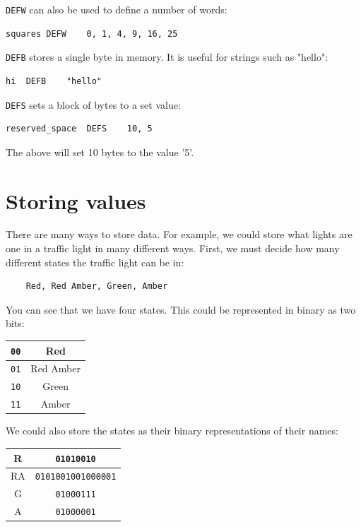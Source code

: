 \documentclass{article}
\begin{document}
{\tt DEFW} can also be used to define a number of words:

\begin{verbatim}
squares	DEFW	0, 1, 4, 9, 16, 25
\end{verbatim}

{\tt DEFB} stores a single byte in memory. It is useful for strings such as "hello":

\begin{verbatim}
hi	DEFB	"hello"
\end{verbatim}

{\tt DEFS} sets a block of bytes to a set value:

\begin{verbatim}
reserved_space	DEFS	10, 5
\end{verbatim}

The above will set 10 bytes to the value '5'.

\section{Storing values}


There are many ways to store data. For example, we could store what lights are
one in a traffic light in many different ways. First, we must decide how many
different states the traffic light can be in:

\begin{verbatim}
	Red, Red Amber, Green, Amber
\end{verbatim}

You can see that we have four states. This could be represented in binary as two
bits:

\begin{center}
	\begin{tabular}{|c|c|}
		\hline
		{\tt 00} & Red\\ \hline
		{\tt 01} & Red Amber\\ \hline
		{\tt 10} & Green\\ \hline
		{\tt 11} & Amber\\ \hline
	\end{tabular}
\end{center}

We could also store the states as their binary representations of their names:

\begin{center}
	\begin{tabular}{|c|c|}
		\hline
		R & {\tt 01010010}\\ \hline
		RA & {\tt 0101001001000001}\\ \hline
		G & {\tt 01000111}\\ \hline
		A & {\tt 01000001}\\ \hline
	\end{tabular}
\end{center}
\end{document}
